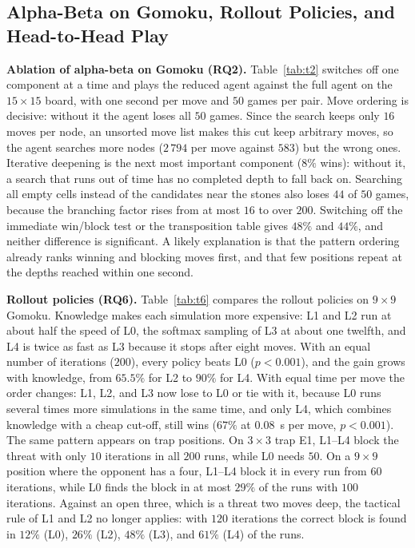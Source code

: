 \subsection{Alpha-Beta on Gomoku, Rollout Policies, and Head-to-Head Play}
\label{subsec:results_tv3}

\textbf{Ablation of alpha-beta on Gomoku (RQ2).} Table~\ref{tab:t2} switches off one component at a time and plays the reduced agent against the full agent on the $15\times 15$ board, with one second per move and $50$ games per pair. Move ordering is decisive: without it the agent loses all $50$ games. Since the search keeps only $16$ moves per node, an unsorted move list makes this cut keep arbitrary moves, so the agent searches more nodes ($2\,794$ per move against $583$) but the wrong ones. Iterative deepening is the next most important component ($8\%$ wins): without it, a search that runs out of time has no completed depth to fall back on. Searching all empty cells instead of the candidates near the stones also loses $44$ of $50$ games, because the branching factor rises from at most $16$ to over $200$. Switching off the immediate win/block test or the transposition table gives $48\%$ and $44\%$, and neither difference is significant. A likely explanation is that the pattern ordering already ranks winning and blocking moves first, and that few positions repeat at the depths reached within one second.

\begin{table}[t]
\centering
\caption{T2: Alpha-beta with one component switched off (A) against the full agent on $15\times 15$ Gomoku, $1$~s per move, $50$ games per row}
\label{tab:t2}
\resizebox{\columnwidth}{!}{}
\end{table}

\textbf{Rollout policies (RQ6).} Table~\ref{tab:t6} compares the rollout policies on $9\times 9$ Gomoku. Knowledge makes each simulation more expensive: L1 and L2 run at about half the speed of L0, the softmax sampling of L3 at about one twelfth, and L4 is twice as fast as L3 because it stops after eight moves. With an equal number of iterations ($200$), every policy beats L0 ($p < 0.001$), and the gain grows with knowledge, from $65.5\%$ for L2 to $90\%$ for L4. With equal time per move the order changes: L1, L2, and L3 now lose to L0 or tie with it, because L0 runs several times more simulations in the same time, and only L4, which combines knowledge with a cheap cut-off, still wins ($67\%$ at $0.08$~s per move, $p < 0.001$). The same pattern appears on trap positions. On $3\times 3$ trap E1, L1--L4 block the threat with only $10$ iterations in all $200$ runs, while L0 needs $50$. On a $9\times 9$ position where the opponent has a four, L1--L4 block it in every run from $60$ iterations, while L0 finds the block in at most $29\%$ of the runs with $100$ iterations. Against an open three, which is a threat two moves deep, the tactical rule of L1 and L2 no longer applies: with $120$ iterations the correct block is found in $12\%$ (L0), $26\%$ (L2), $48\%$ (L3), and $61\%$ (L4) of the runs.

